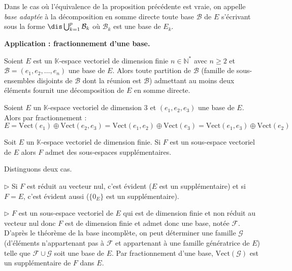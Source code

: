 \documentclass[a4paper,10pt]{report}
\begin{document}
\begin{defin} Dans le cas où l'équivalence de la proposition précédente est vraie, on appelle \textit{base adaptée} à la décomposition en somme directe toute base $\mathcal{B}$ de $E$ s'écrivant sous la forme $\dis \bigcup_{k=1}^p \mathcal{B}_k$ où $\mathcal{B}_k$ est une base de $E_k$.
\end{defin}

\noindent \textbf{Application : fractionnement d'une base.}

\noindent Soient $E$ est un $\mathbb{K}$-espace vectoriel de dimension finie $n \in \mathbb{N}^*$ avec $n \geq 2$ et $\mathcal{B}=(e_1, e_2, \ldots, e_n)$ une base de $E$. Alors toute partition de $\mathcal{B}$ (famille de sous-ensembles disjoints de $\mathcal{B}$ dont la réunion est $\mathcal{B}$) admettant au moins deux éléments fournit une décomposition de $E$ en somme directe.

\medskip

\begin{ex} Soient $E$ un $\mathbb{K}$-espace vectoriel de dimension $3$ et $(e_1,e_2,e_3)$ une base de $E$. Alors par fractionnement :
$$ E = \textrm{Vect}(e_1) \oplus \textrm{Vect}(e_2,e_3) = \textrm{Vect}(e_1,e_2) \oplus \textrm{Vect}(e_3) = \textrm{Vect}(e_1,e_3) \oplus \textrm{Vect}(e_2) $$
\end{ex}

\medskip

\begin{cor} Soit $E$ un $\mathbb{K}$-espace vectoriel de dimension finie. Si $F$ est un sous-espace vectoriel de $E$ alors $F$ admet des sous-espaces supplémentaires.
\end{cor}

\begin{preuve} Distinguons deux cas.

\noindent $\rhd$ Si $F$ est réduit au vecteur nul, c'est évident ($E$ est un supplémentaire) et si $F=E$, c'est évident aussi ($\lbrace 0_E\rbrace$ est un supplémentaire).

\medskip

\noindent $\rhd$ $F$ est un sous-espace vectoriel de $E$ qui est de dimension finie et non réduit au vecteur nul donc $F$ est de dimension finie et admet donc une base, notée $\mathcal{F}$. D'après le théorème de la base incomplète, on peut déterminer une famille $\mathcal{G}$ (d'éléments n'appartenant pas à $\mathcal{F}$ et appartenant à une famille génératrice de $E$) telle que $\mathcal{F} \cup \mathcal{G}$ soit une base de $E$. Par fractionnement d'une base, $\textrm{Vect}(\mathcal{G})$ est un supplémentaire de $F$ dans $E$.
\end{preuve}
\end{document}
